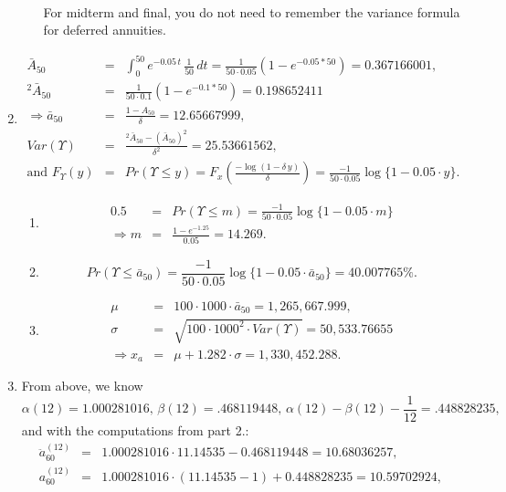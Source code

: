 \documentclass[11pt,fleqn,oneside]{book}
\begin{document}
\begin{enumerate}
\begin{itemize}
\begin{eqnarray*}
\end{eqnarray*}
For midterm and final, you do not need to remember the variance formula for deferred annuities.
\end{itemize}
\item 
\begin{eqnarray*}
\bar{A}_{50} &=& \int_0^{50} e^{-0.05\,t}\,\frac{1}{50}\,dt = \frac{1}{50\cdot 0.05} \left(1-e^{-0.05*50}\right) = 0.367166001,\\
{^2\bar{A}_{50}} &=& \frac{1}{50\cdot 0.1} \left(1-e^{-0.1*50}\right) = 0.198652411\\
\Rightarrow \bar{a}_{50} &=& \frac{1-A_{50}}{\delta} = 12.65667999,\\
Var(\Upsilon) &=& \frac{{^2\bar{A}_{50}} - (\bar{A}_{50})^2}{\delta^2} = 25.53661562,\\
\text{and } F_{\Upsilon}(y) &=& Pr(\Upsilon \leq y) = F_{x}\left(\frac{-\log(1-\delta\,y)}{\delta}\right) = \frac{-1}{50\cdot 0.05} \log\{1-0.05\cdot y\}. 
\end{eqnarray*}
\begin{enumerate}
\item 
\begin{eqnarray*}
0.5 &=& Pr(\Upsilon \leq m) = \frac{-1}{50\cdot 0.05} \log\{1-0.05\cdot m\}  \\
\Rightarrow m &=& \frac{1 - e^{-1.25}}{0.05} = 14.269.
\end{eqnarray*}
\item 
$$
Pr(\Upsilon \leq \bar{a}_{50}) = \frac{-1}{50\cdot 0.05} \log\{1-0.05\cdot \bar{a}_{50}\}
=40.007765\%. 
$$
\item
\begin{eqnarray*}
\mu &=& 100 \cdot 1000 \cdot \bar{a}_{50} = 1,265,667.999,\\
\sigma &=& \sqrt{100 \cdot 1000^2 \cdot Var(\Upsilon)} = 50,533.76655\\
\Rightarrow x_a &=& \mu + 1.282\cdot \sigma = 1,330,452.288.
\end{eqnarray*}
\end{enumerate}
\item From above, we know
$$
\alpha(12) = 1.000281016,\,\beta(12) = .468119448,\,\alpha(12) - \beta(12) - \frac{1}{12} = .448828235,
$$
and with the computations from part 2.:
\begin{eqnarray*}
{\ddot{a}_{60}^{(12)}} &=& 1.000281016\cdot 11.14535 - 0.468119448 = 10.68036257,\\
{a_{60}^{(12)}} &=& 1.000281016\cdot (11.14535 -1 )+ 0.448828235 = 10.59702924,\\

\end{eqnarray*}
\end{enumerate}
\end{document}
